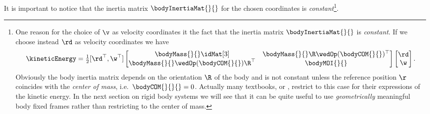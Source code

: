 It is important to notice that the inertia matrix $\bodyInertiaMat{}{}$ for the chosen coordinates is \textit{constant}\footnote{
One reason for the choice of $\v$ as velocity coordinates it the fact that the inertia matrix $\bodyInertiaMat{}{}$ is \textit{constant}.
If we choose instead $\rd$ as velocity coordinates we have
\begin{align*}
 \kineticEnergy = \tfrac{1}{2} [\rd^\top, \w^\top] \begin{bmatrix} \bodyMass{}{} \idMat[3] & \bodyMass{}{} \R \wedOp(\bodyCOM{}{})^\top \\ \bodyMass{}{} \wedOp(\bodyCOM{}{}) \R^\top & \bodyMOI{}{} \end{bmatrix} \begin{bmatrix} \rd \\ \w \end{bmatrix}.
\end{align*}
Obviously the body inertia matrix depends on the orientation $\R$ of the body and is not constant unless the reference position $\r$ coincides with the \textit{center of mass}, i.e.\ $\bodyCOM{}{}{} = 0$.
Actually many textbooks, \eg \cite[p.\,167]{Murray:Robotic} or \cite[p.\,153]{Shabana:MultibodySystems}, restrict to this case for their expressions of the kinetic energy.
In the next section on rigid body systems we will see that it can be quite useful to use \textit{geometrically} meaningful body fixed frames rather than restricting to the center of mass.
}.

